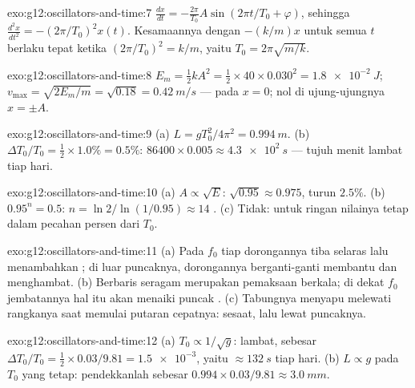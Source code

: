 \begin{solution}{exo:g12:oscillators-and-time:7}
$\frac{dx}{dt} = -\frac{2\pi}{T_0}A\sin(2\pi t/T_0 + \varphi)$, sehingga
$\frac{d^2x}{dt^2} = -(2\pi/T_0)^2 x(t)$. Kesamaannya dengan $-(k/m)x$
untuk semua $t$ berlaku tepat ketika $(2\pi/T_0)^2 = k/m$, yaitu
$T_0 = 2\pi\sqrt{m/k}$.
\end{solution}

\begin{solution}{exo:g12:oscillators-and-time:8}
$E_m = \tfrac12 kA^2 = \tfrac12 \times 40 \times 0.030^2 =
\qty{1.8e-2}{J}$; $v_{\max} = \sqrt{2E_m/m} = \sqrt{0.18} =
\qty{0.42}{m/s}$ --- pada $x = 0$; nol di ujung-ujungnya $x = \pm A$.
\end{solution}

\begin{solution}{exo:g12:oscillators-and-time:9}
(a) $L = gT_0^2/4\pi^2 = \qty{0.994}{m}$. (b) $\Delta T_0/T_0 =
\tfrac12 \times 1.0\% = 0.5\%$: $86400 \times 0.005 \approx
\qty{4.3e2}{s}$ --- tujuh menit lambat tiap hari.
\end{solution}

\begin{solution}{exo:g12:oscillators-and-time:10}
(a) $A \propto \sqrt{E}$: $\sqrt{0.95} \approx 0.975$, turun
$2.5\%$. (b) $0.95^n = 0.5$: $n = \ln 2/\ln(1/0.95) \approx 14$
. (c) Tidak: untuk  ringan nilainya tetap dalam pecahan
persen dari $T_0$.
\end{solution}

\begin{solution}{exo:g12:oscillators-and-time:11}
(a) Pada $f_0$ tiap dorongannya tiba selaras lalu menambahkan ; di luar
puncaknya, dorongannya berganti-ganti membantu dan menghambat. (b) Berbaris
seragam merupakan pemaksaan berkala; di dekat $f_0$ jembatannya hal itu akan
menaiki puncak . (c) Tabungnya menyapu melewati 
rangkanya saat memulai putaran cepatnya:  sesaat, lalu lewat puncaknya.
\end{solution}

\begin{solution}{exo:g12:oscillators-and-time:12}
(a) $T_0 \propto 1/\sqrt{g}$: lambat, sebesar $\Delta T_0/T_0 = \tfrac12
\times 0.03/9.81 = \num{1.5e-3}$, yaitu $\approx \qty{132}{s}$ tiap
hari. (b) $L \propto g$ pada $T_0$ yang tetap: pendekkanlah sebesar $0.994 \times
0.03/9.81 \approx \qty{3.0}{mm}$.
\end{solution}

